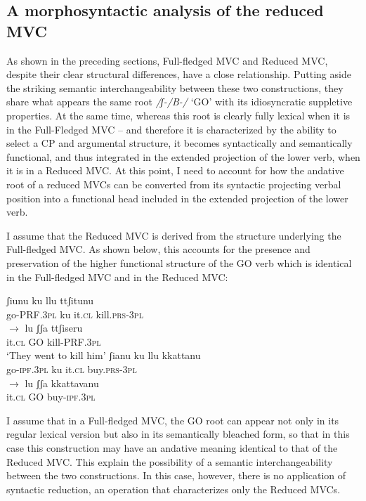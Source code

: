 \documentclass[output=paper]{langscibook}
\begin{document}
\subsection{A morphosyntactic analysis of the reduced MVC}

As shown in the preceding sections, Full-fledged MVC and Reduced MVC, despite their clear structural differences, have a close relationship. Putting aside the striking semantic interchangeability between these two constructions, they share what appears the same root \textit{/ʃ-/B-/} ‘GO’ with its idiosyncratic suppletive properties. At the same time, whereas this root is clearly fully lexical when it is in the  Full-Fledged MVC -- and therefore it is characterized by the ability to select a CP and argumental structure, it becomes syntactically and semantically functional, and thus integrated in the extended projection of the lower verb, when it is in a Reduced MVC.  At this point, I need to account for how the andative root of a reduced MVCs can be converted from its syntactic projecting verbal position into a functional head included in the extended projection of the lower verb.

I assume that the Reduced MVC is derived from the structure underlying the Full-fledged MVC. As shown below, this accounts for the presence and preservation of the higher functional structure of the GO verb which is identical in the Full-fledged MVC and in the Reduced MVC:

\ea \label{ac62}
    \ea \label{ac62a}
        \ea\label{ac62ai}\gll ʃiunu ku llu ttʃitunu\\
        go-PRF.\textsc{3pl} ku it.\textsc{cl} kill.\textsc{prs}-\textsc{3pl}\\
        \ex \label{ac62aii}$\rightarrow$ \gll lu    ʃʃa   ttʃiseru\\
        it.\textsc{cl}  GO  kill-PRF.\textsc{3pl}\\
        \glt ‘They went to kill him’
        \z
    \ex\label{ac62b}
        \ea \label{ac62bi}\gll ʃianu ku  llu kkattanu\\
        go-\textsc{ipf}.\textsc{3pl} ku it.\textsc{cl} buy.\textsc{prs}-\textsc{3pl}\\
        \ex \label{ac62bii}$\rightarrow$ \gll lu ʃʃa  kkattavanu\\
        it.\textsc{cl} GO  buy-\textsc{ipf}.\textsc{3pl}\\
        \z
    \z
\z

I assume that in a Full-fledged MVC, the GO root can appear not only in its regular lexical version but also in its semantically bleached form, so that in this case this construction may have an andative meaning identical to that of the Reduced MVC. This explain the possibility of a semantic interchangeability between the two constructions. In this case, however, there is no application of syntactic reduction, an operation that characterizes only the Reduced MVCs.
\end{document}
